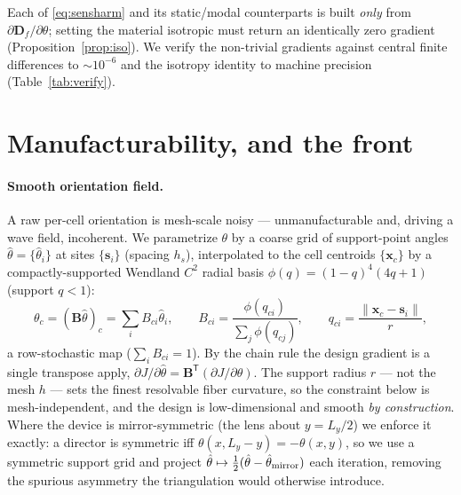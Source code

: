 \documentclass[preprint,11pt]{elsarticle}
\newcommand{\vx}{\mathbf{x}}
\newcommand{\Tp}{^{\mathsf{T}}}
\newcommand{\Df}{\mathbf{D}_f}
\theoremstyle{plain}\newtheorem{proposition}{Proposition}
\theoremstyle{remark}\newtheorem{remark}{Remark}
\begin{document}
\medskip
\noindent Each of \eqref{eq:sensharm} and its static/modal counterparts is built
\emph{only} from $\partial\Df/\partial\theta$; setting the material isotropic must return
an identically zero gradient (Proposition~\ref{prop:iso}). We verify the non-trivial
gradients against central finite differences to $\sim\!10^{-6}$ and the isotropy identity
to machine precision (Table~\ref{tab:verify}).

\section{Manufacturability, and the front}
\label{sec:front}
\paragraph{Smooth orientation field.} A raw per-cell orientation is mesh-scale noisy ---
unmanufacturable and, driving a wave field, incoherent. We parametrize $\theta$ by a coarse
grid of support-point angles $\hat\theta=\{\hat\theta_i\}$ at sites $\{\mathbf s_i\}$
(spacing $h_s$), interpolated to the cell centroids $\{\vx_c\}$ by a compactly-supported
Wendland $C^2$ radial basis $\phi(q)=(1-q)^4(4q+1)$ (support $q<1$):
\begin{equation}
  \theta_c=(\mathbf B\hat\theta)_c=\sum_i B_{ci}\hat\theta_i,\qquad
  B_{ci}=\frac{\phi(q_{ci})}{\sum_j\phi(q_{cj})},\qquad
  q_{ci}=\frac{\lVert\vx_c-\mathbf s_i\rVert}{r},
  \label{eq:rbf}
\end{equation}
a row-stochastic map ($\sum_i B_{ci}=1$). By the chain rule the design gradient is a single
transpose apply, $\partial J/\partial\hat\theta=\mathbf B\Tp(\partial J/\partial\theta)$.
The support radius $r$ --- not the mesh $h$ --- sets the finest resolvable fiber curvature,
so the constraint below is mesh-independent, and the design is low-dimensional and smooth
\emph{by construction}. Where the device is mirror-symmetric (the lens about $y=L_y/2$) we
enforce it exactly: a director is symmetric iff $\theta(x,L_y{-}y)=-\theta(x,y)$, so we use a
symmetric support grid and project $\hat\theta\mapsto\tfrac12(\hat\theta-\hat\theta_{\rm
mirror})$ each iteration, removing the spurious asymmetry the triangulation would otherwise
introduce.
\end{document}
